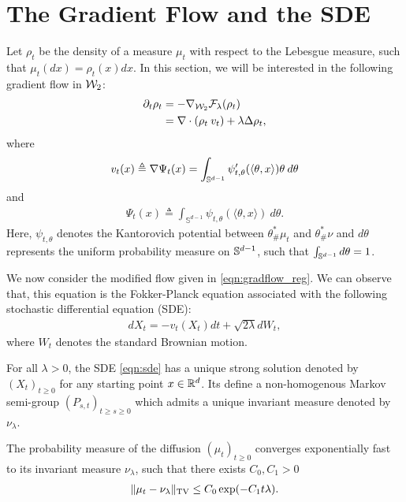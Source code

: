 
\section{The Gradient Flow and the SDE}

Let $\rho_t$ be the density of a measure $\mu_t$ with respect to the Lebesgue measure, such that $\mu_t(dx) = \rho_t(x) dx$. In this section, we will be interested in the following gradient flow in ${\cal W}_2$:
\begin{align}
\partial_t \rho_t &= - \nabla_{{\cal W}_2} {\cal F}_\lambda(\rho_t) \\
&=  \nabla \cdot (\rho_t \> v_t) + \lambda \Delta \rho_t, \label{eqn:gradflow_reg}
\end{align}
where 
\begin{align}
v_t(x) \triangleq \nabla \Psi_t(x) = \int_{\mathbb{S}^{d-1}} \psi'_{t,\theta}(\langle \theta, x \rangle) \theta \> d\theta \label{eqn:idt_v}
\end{align}
and
\begin{align}
\Psi_t(x) \triangleq \int_{\mathbb{S}^{d-1}} \psi_{t,\theta}(\langle \theta, x \rangle) \> d\theta.
\end{align}
Here, $\psi_{t,\theta}$ denotes the Kantorovich potential between $\theta^*_{\#}\mu_t$ and $\theta^*_{\#}\nu$ and $d\theta$ represents the uniform probability measure on $\mathbb{S}^{d-1}$, such that $\int_{\mathbb{S}^{d-1}} d \theta = 1$.

We now consider the modified flow given in \eqref{eqn:gradflow_reg}. We can observe that, this equation is the Fokker-Planck equation associated with the following stochastic differential equation (SDE):
\begin{align}
d X_t = - v_t(X_t) dt + \sqrt{2 \lambda } d W_t, \label{eqn:sde}
\end{align}
where $W_t$ denotes the standard Brownian motion.

\begin{assumption}
\label{asmp:sde_ergo}
For all $\lambda >0$, the SDE  \eqref{eqn:sde} has a unique strong solution denoted by $(X_t)_{t\geq 0}$ for any starting point $x \in \mathbb{R}^d$. Its define a non-homogenous Markov semi-group $(P_{s,t})_{t\geq s\geq 0}$ which admits a unique invariant measure denoted by $\nu_\lambda$. %
\end{assumption}

\begin{assumption}
\label{asmp:sde_expconv}
The probability measure of the diffusion $(\mu_t)_{t\geq 0}$ converges exponentially fast to its invariant measure $\nu_\lambda$, such that there exists $C_0, C_1 >0$
\begin{align}
\|\mu_t - \nu_\lambda \|_{\textnormal{TV}} \leq C_0 \exp(-C_1 t \lambda).
\end{align}
\end{assumption}

